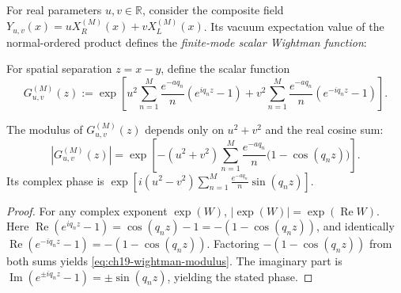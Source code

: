 For real parameters $u, v \in \mathbb R$, consider the composite field
$Y_{u,v}(x) = u X_R^{(M)}(x) + v X_L^{(M)}(x)$.  Its vacuum expectation
value of the normal-ordered product defines the \emph{finite-mode scalar Wightman function}:

\begin{definition}
\label{def:ch19-scalar-wightman}
For spatial separation $z = x - y$, define the scalar function
\begin{equation}
 \boxed{
 G_{u,v}^{(M)}(z)
  := \exp\left[ u^2 \sum_{n=1}^M \frac{e^{-a q_n}}{n} (e^{i q_n z} - 1)
               + v^2 \sum_{n=1}^M \frac{e^{-a q_n}}{n} (e^{-i q_n z} - 1) \right].
 }
 \label{eq:ch19-scalar-wightman}
\end{equation}
\end{definition}

\begin{proposition}
\label{prop:ch19-wightman-modulus}
The modulus of $G_{u,v}^{(M)}(z)$ depends only on $u^2+v^2$ and the real cosine sum:
\begin{equation}
 \boxed{
 |G_{u,v}^{(M)}(z)|
  = \exp\left[ -(u^2+v^2) \sum_{n=1}^M \frac{e^{-a q_n}}{n} \bigl(1 - \cos(q_n z)\bigr) \right].
 }
 \label{eq:ch19-wightman-modulus}
\end{equation}
Its complex phase is $\exp[i (u^2 - v^2) \sum_{n=1}^M \frac{e^{-a q_n}}{n} \sin(q_n z)]$.
\end{proposition}
\begin{proof}
For any complex exponent $\exp(W)$, $|\exp(W)| = \exp(\operatorname{Re} W)$.
Here
$\operatorname{Re}(e^{i q_n z} - 1) = \cos(q_n z) - 1 = -(1 - \cos(q_n z))$,
and identically $\operatorname{Re}(e^{-i q_n z} - 1) = -(1 - \cos(q_n z))$.
Factoring $-(1 - \cos(q_n z))$ from both sums yields \eqref{eq:ch19-wightman-modulus}.
The imaginary part is $\operatorname{Im}(e^{\pm i q_n z} - 1) = \pm \sin(q_n z)$,
yielding the stated phase.
\end{proof}

